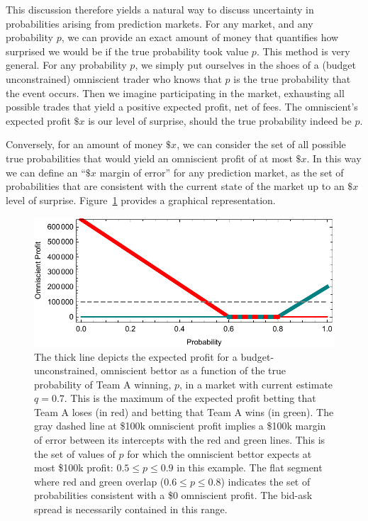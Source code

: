 \documentclass[sigconf,anonymous]{aamas}   %
\begin{document}
This discussion therefore yields a natural way to discuss uncertainty in probabilities arising from prediction markets. For any market, and any probability $p$, we can provide an exact amount of money that quantifies how surprised we would be if the true probability took value $p$.
This method is very general. For any probability $p$, we simply put ourselves in the shoes of a (budget unconstrained) omniscient trader who knows that $p$ is the true probability that the event occurs. Then we imagine participating in the market, exhausting all possible trades that yield a positive expected profit, net of fees. 
The omniscient's expected profit $\$x$ is our level of surprise, should the true probability indeed be $p$.

Conversely, for an amount of money $\$x$, we can consider the set of all possible true probabilities that would yield an omniscient profit of at most $\$x$. 
In this way we can define an ``$\$x$ margin of error'' for any prediction market, as the set of probabilities that are consistent with the current state of the market up to an $\$x$ level of surprise. 
Figure~\ref{fig:godprofit} provides a graphical representation. 

\begin{figure}
\centering
\includegraphics[width=\columnwidth]{god-profit.pdf}
\caption{
The thick line depicts the expected profit for a budget-unconstrained, omniscient bettor as a function of the true probability of Team A winning, $p$, in a market with current estimate $q=0.7$.
This is the maximum of the expected profit betting that Team A loses (in red) and betting that Team A wins (in green).
The gray dashed line at \$100k omniscient profit implies a \$100k margin of error between its intercepts with the red and green lines.
This is the set of values of $p$ for which the omniscient bettor expects at most \$100k profit: $0.5\le p\le 0.9$ in this example.
The flat segment where red and green overlap ($0.6\le p\le 0.8$) indicates the set of probabilities consistent with a \$0 omniscient profit. 
The bid-ask spread is necessarily contained in this range.}
\label{fig:godprofit}
\vspace{-0.4cm}
\end{figure}
\end{document}
